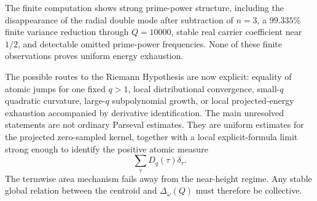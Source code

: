 \documentclass[11pt]{amsart}
\numberwithin{equation}{section}
\theoremstyle{plain}
\theoremstyle{definition}
\theoremstyle{remark}
\newcommand{\1}{\mathbf{1}}
\begin{document}
The finite computation shows strong prime-power structure,
including the disappearance of the radial double mode after subtraction of
\(n=3\), a \(99.335\%\) finite variance reduction through \(Q=10000\),
stable real carrier coefficient near \(1/2\), and detectable omitted
prime-power frequencies.  None of these finite observations proves
uniform energy exhaustion.

The possible routes to the Riemann Hypothesis are now explicit: equality of
atomic jumps for one fixed \(q>1\), local distributional convergence,
small-\(q\) quadratic curvature, large-\(q\) subpolynomial growth, or local
projected-energy exhaustion accompanied by derivative identification.  The
main unresolved statements are not ordinary Parseval estimates.  They are
uniform estimates for the projected zero-sampled kernel, together with a
local explicit-formula limit strong enough to identify the positive atomic
measure
\begin{equation}
\sum_\tau D_q(\tau)\delta_\tau.
\label{eq:conclusion_positive_measure}
\end{equation}
The termwise area mechanism fails away from the near-height regime.
Any stable global relation between the centroid and
\(\Delta_\omega(Q)\) must therefore be collective.
\end{document}
